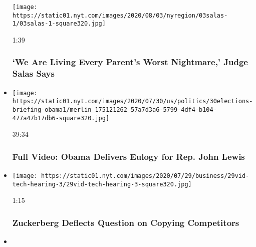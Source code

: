 \begin{itemize}
  \texttt{[image: https://static01.nyt.com/images/2020/08/03/nyregion/03salas-1/03salas-1-square320.jpg]}

  1:39

  \hypertarget{we-are-living-every-parents-worst-nightmare-judge-salas-says}{%
  \subsubsection{`We Are Living Every Parent's Worst Nightmare,' Judge
  Salas
  Says}\label{we-are-living-every-parents-worst-nightmare-judge-salas-says}}
\item
  \href{https://www.nytimes.com/video/us/100000007264733/obama-john-lewis-funeral.html?action=click\&module=video-series-bar\&region=header\&pgtype=Article\&playlistId=video/u-s}{}

  \texttt{[image: https://static01.nyt.com/images/2020/07/30/us/politics/30elections-briefing-obama1/merlin\_175121262\_57a7d3a6-5799-4df4-b104-477a47b17db6-square320.jpg]}

  39:34

  \hypertarget{full-video-obama-delivers-eulogy-for-rep-john-lewis}{%
  \subsubsection{Full Video: Obama Delivers Eulogy for Rep. John
  Lewis}\label{full-video-obama-delivers-eulogy-for-rep-john-lewis}}
\item
  \href{https://www.nytimes.com/video/us/politics/100000007263272/zuckerberg-jayapal-facebook.html?action=click\&module=video-series-bar\&region=header\&pgtype=Article\&playlistId=video/u-s}{}

  \texttt{[image: https://static01.nyt.com/images/2020/07/29/business/29vid-tech-hearing-3/29vid-tech-hearing-3-square320.jpg]}

  1:15

  \hypertarget{zuckerberg-deflects-question-on-copying-competitors}{%
  \subsubsection{Zuckerberg Deflects Question on Copying
  Competitors}\label{zuckerberg-deflects-question-on-copying-competitors}}
\item
  \href{https://www.nytimes.com/video/us/100000007263183/bezos-amazon-predatory-practices.html?action=click\&module=video-series-bar\&region=header\&pgtype=Article\&playlistId=video/u-s}{}


\end{itemize}
